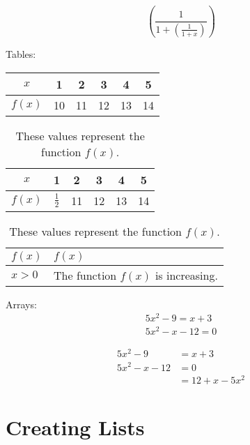 \documentclass{article}
\begin{document}
$$\left(  \frac{1}{1 + \left( \frac{1}{1+x} \right)}  \right)$$

Tables:\\

\begin{tabular}{|c|c|c|c|c|c|}
  \hline
  $x$    & 1  & 2  & 3  & 4  & 5 \\ \hline
  $f(x)$ & 10 & 11 & 12 & 13 & 14 \\ \hline
\end{tabular}

\vspace{1cm}

\begin{table}[H]
  \centering
  \def\arraystretch{1.3}
  \begin{tabular}{|c|c|c|c|c|c|}
    \hline
    $x$    & 1  & 2  & 3  & 4  & 5 \\ \hline
    $f(x)$ & $\frac{1}{2}$ & 11 & 12 & 13 & 14 \\ \hline
  \end{tabular}
  \caption{These values represent the function $f(x)$.}
\end{table}

\begin{table}[H]
  \centering
  \def\arraystretch{1.3}
  \caption{These values represent the function $f(x)$.}
  \begin{tabular}{|l|p{2cm}|}
    \hline
    $f(x)$ & $f(x)$ \\ \hline
    $x>0$  & The function $f(x)$ is increasing. \\ \hline
  \end{tabular}
\end{table}

Arrays:
\begin{align}
	5x^2-9=x+3\\
	5x^2-x-12=0
\end{align}

\begin{align*}
	5x^2-9&=x+3\\
	5x^2-x-12&=0\\
	&=12+x-5x^2
\end{align*}

\pagebreak

\section{Creating Lists}
\end{document}
